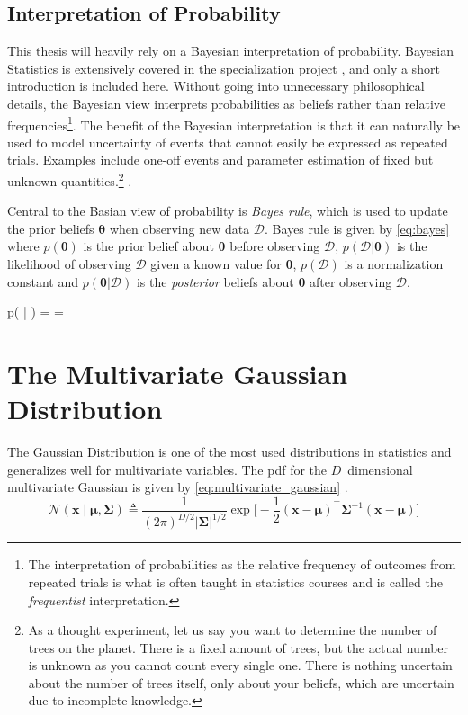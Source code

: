 \subsection{Interpretation of Probability}
This thesis will heavily rely on a Bayesian interpretation of probability. Bayesian Statistics is extensively covered in the specialization project \cite{mellbye}, and only a short introduction is included here. Without going into unnecessary philosophical details, the Bayesian view interprets probabilities as beliefs rather than relative frequencies\footnote{The interpretation of probabilities as the relative frequency of outcomes from repeated trials is what is often taught in statistics courses and is called the \textit{frequentist} interpretation.}. 
The benefit of the Bayesian interpretation is that it can naturally be used to model uncertainty of events that cannot easily be expressed as repeated trials. Examples include one-off events and parameter estimation of fixed but unknown quantities.\footnote{As a thought experiment, let us say you want to determine the number of trees on the planet. There is a fixed amount of trees, but the actual number is unknown as you cannot count every single one. There is nothing uncertain about the number of trees itself, only about your beliefs, which are uncertain due to incomplete knowledge.} \cite{murphy}.

Central to the Basian view of probability is \textit{Bayes rule}, which is used to update the prior beliefs $\boldsymbol{\theta}$ when observing new data $\mathcal{D}$. Bayes rule is given by \cref{eq:bayes} where $p(\boldsymbol{\theta})$ is the prior belief about $\boldsymbol{\theta}$ before observing $\mathcal{D}$, $p(\mathcal{D} | \boldsymbol{\theta})$ is the likelihood of observing $\mathcal{D}$ given a known value for $\boldsymbol{\theta}$, $p(\mathcal{D})$ is a normalization constant and $p(\boldsymbol{\theta} | \mathcal{D})$ is the \textit{posterior} beliefs about $\boldsymbol{\theta}$ after observing $\mathcal{D}$. 
\begin{tcolorbox}[ams equation, title={Bayes Rule}]\label{eq:bayes}
    p(\boldsymbol{\theta} | ) =  = 
\end{tcolorbox}

\section{The Multivariate Gaussian Distribution}
The Gaussian Distribution is one of the most used distributions in statistics \cite{murphy} and generalizes well for multivariate variables. The pdf for the $D$ dimensional multivariate Gaussian is given by \cref{eq:multivariate_gaussian} \cite{murphy,rasmussen}.
\begin{equation}\label{eq:multivariate_gaussian}
    \mathcal{N}(\boldsymbol{x} \; | \; \boldsymbol{\mu}, \boldsymbol{\Sigma}) \triangleq \frac{1}{(2 \pi)^{D/2} |\boldsymbol{\Sigma} | ^{1/2}} \exp \bigg[- \frac{1}{2} (\boldsymbol{x} - \boldsymbol{\mu})^\intercal \boldsymbol{\Sigma}^{-1}(\boldsymbol{x} - \boldsymbol{\mu})\bigg]
\end{equation}
